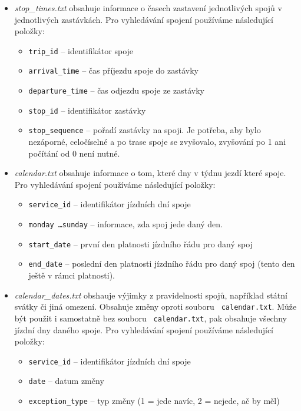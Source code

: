 \begin{itemize}
\begin{itemize}
\end{itemize}
\item {\em stop\_times.txt} obsahuje informace o časech zastavení jednotlivých
spojů v jednotlivých zastávkách. Pro vyhledávání spojení používáme následující
položky:
\begin{itemize}
	\item {\tt trip\_id} -- identifikátor spoje
	\item {\tt arrival\_time} -- čas příjezdu spoje do zastávky 
	\item {\tt departure\_time} -- čas odjezdu spoje ze zastávky
	\item {\tt stop\_id} -- identifikátor zastávky
	\item {\tt stop\_sequence} -- pořadí zastávky na spoji. Je potřeba, aby
	bylo nezáporné, celočíselné a po trase spoje se zvyšovalo, zvyšování po
	1 ani počítání od 0 není nutné.
\end{itemize}
\item {\em calendar.txt} obsahuje informace o tom, které dny v týdnu jezdí které
spoje. Pro vyhledávání spojení používáme následující položky:
\begin{itemize}
	\item {\tt service\_id} -- identifikátor jízdních dní spoje
	\item {\tt monday \dots sunday} -- informace, zda spoj jede daný den. 
	\item {\tt start\_date} -- první den platnosti jízdního řádu pro daný
	spoj
	\item {\tt end\_date} -- poslední den platnosti jízdního řádu pro daný
	spoj (tento den ještě v rámci platnosti).
\end{itemize}
\item {\em calendar\_dates.txt} obshauje výjimky z pravidelnosti spojů,
například státní svátky či jiná omezení. Obsahuje změny oproti souboru {\tt
calendar.txt}. Může být použit i samostatně bez souboru {\tt
calendar.txt}, pak obsahuje všechny jízdní dny daného spoje. Pro vyhledávání
spojení používáme následující položky:
\begin{itemize}
	\item {\tt service\_id} -- identifikátor jízdních dní spoje 
	\item {\tt date} -- datum změny
	\item {\tt exception\_type} -- typ změny (1 = jede navíc, 2 = nejede, ač
	by měl)
\end{itemize}
\end{itemize}

